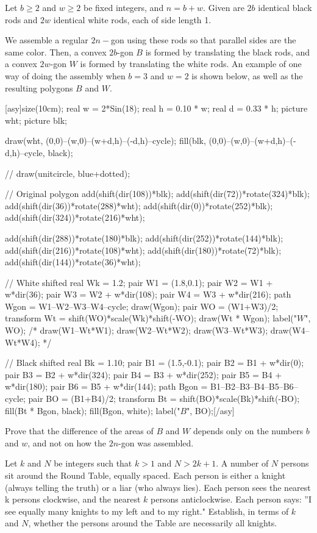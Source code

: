 \documentclass[11pt]{scrartcl}
\begin{document}
\begin{problem}[2594275832195659804]
Let $b\geq2$ and $w\geq2$ be fixed integers, and $n=b+w$. Given are $2b$ identical black rods and $2w$ identical white rods, each of side length 1.

We assemble a regular $2n-$gon using these rods so that parallel sides are the same color. Then, a convex $2b$-gon $B$ is formed by translating the black rods, and a convex $2w$-gon $W$ is formed by translating the white rods. An example of one way of doing the assembly when $b=3$ and $w=2$ is shown below, as well as the resulting polygons $B$ and $W$.

[asy]size(10cm);
real w = 2*Sin(18);
real h = 0.10 * w;
real d = 0.33 * h;
picture wht;
picture blk;

draw(wht, (0,0)--(w,0)--(w+d,h)--(-d,h)--cycle);
fill(blk, (0,0)--(w,0)--(w+d,h)--(-d,h)--cycle, black);

// draw(unitcircle, blue+dotted);

// Original polygon
add(shift(dir(108))*blk);
add(shift(dir(72))*rotate(324)*blk);
add(shift(dir(36))*rotate(288)*wht);
add(shift(dir(0))*rotate(252)*blk);
add(shift(dir(324))*rotate(216)*wht);

add(shift(dir(288))*rotate(180)*blk);
add(shift(dir(252))*rotate(144)*blk);
add(shift(dir(216))*rotate(108)*wht);
add(shift(dir(180))*rotate(72)*blk);
add(shift(dir(144))*rotate(36)*wht);

// White shifted
real Wk = 1.2;
pair W1 = (1.8,0.1);
pair W2 = W1 + w*dir(36);
pair W3 = W2 + w*dir(108);
pair W4 = W3 + w*dir(216);
path Wgon = W1--W2--W3--W4--cycle;
draw(Wgon);
pair WO = (W1+W3)/2;
transform Wt = shift(WO)*scale(Wk)*shift(-WO);
draw(Wt * Wgon);
label("$W$", WO);
/*
draw(W1--Wt*W1);
draw(W2--Wt*W2);
draw(W3--Wt*W3);
draw(W4--Wt*W4);
*/

// Black shifted
real Bk = 1.10;
pair B1 = (1.5,-0.1);
pair B2 = B1 + w*dir(0);
pair B3 = B2 + w*dir(324);
pair B4 = B3 + w*dir(252);
pair B5 = B4 + w*dir(180);
pair B6 = B5 + w*dir(144);
path Bgon = B1--B2--B3--B4--B5--B6--cycle;
pair BO = (B1+B4)/2;
transform Bt = shift(BO)*scale(Bk)*shift(-BO);
fill(Bt * Bgon, black);
fill(Bgon, white);
label("$B$", BO);[/asy]

Prove that the difference of the areas of $B$ and $W$ depends only on the numbers $b$ and $w$, and not on how the $2n$-gon was assembled.
\end{problem}
\begin{problem}[903527073927588393]
Let $k$ and $N$ be integers such that $k > 1$ and $N > 2k + 1$. A number of $N$ persons sit around the Round Table, equally spaced. Each person is either a knight (always telling the truth) or a liar (who always lies). Each person sees the nearest k persons clockwise, and the nearest $k$ persons anticlockwise. Each person says: ''I see equally many knights to my left and to my right." Establish, in terms of $k$ and $N$, whether the persons around the Table are necessarily all knights.
\end{problem}
\end{document}
